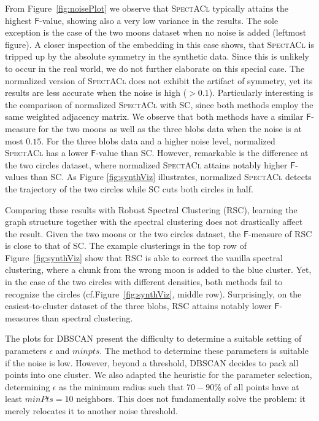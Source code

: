 From Figure~\ref{fig:noisePlot} we observe that \textsc{SpectACl} typically attains the highest $\mathsf{F}$-value, showing also a very low variance in the results. The sole exception is the case of the two moons dataset when no noise is added (leftmost figure). A closer inspection of the embedding in this case shows, that \textsc{SpectACl} is tripped up by the absolute symmetry in the synthetic data. Since this is unlikely to occur in the real world, we do not further elaborate on this special case. 
The normalized version of \textsc{SpectACl} does not exhibit the artifact of symmetry, yet its results are less accurate when the noise is high ($>0.1$). Particularly interesting is the comparison of normalized \textsc{SpectACl} with \textsc{SC}, since both methods employ the same weighted adjacency matrix. We observe that both methods have a similar $\mathsf{F}$-measure for the two moons as well as the three blobs data when the noise is at most $0.15$. For the three blobs data and a higher noise level, normalized \textsc{SpectACl} has a lower $\mathsf{F}$-value than \textsc{SC}. However, remarkable is the difference at the two circles dataset, where  normalized \textsc{SpectACl} attains notably higher $\mathsf{F}$-values than \textsc{SC}. As Figure \ref{fig:synthViz} illustrates, normalized \textsc{SpectACl} detects the trajectory of the two circles while \textsc{SC} cuts both circles in half. 

Comparing these results with Robust Spectral Clustering (\textsc{RSC}), learning the graph structure together with the spectral clustering does not drastically affect the result. Given the two moons or the two circles dataset, the $\mathsf{F}$-measure of \textsc{RSC} is close to that of \textsc{SC}. The example clusterings in the top row of Figure~\ref{fig:synthViz} show that \textsc{RSC} is able to correct the vanilla spectral clustering, where a chunk from the wrong moon is added to the blue cluster. Yet, in the case of the two circles with different densities, both methods fail to recognize the circles (cf.\@ Figure~\ref{fig:synthViz}, middle row). Surprisingly, on the easiest-to-cluster dataset of the three blobs, \textsc{RSC} attains notably lower $\mathsf{F}$-measures than spectral clustering.

The plots for DBSCAN present the difficulty to determine a suitable setting of parameters $\epsilon$ and $minpts$. The method to determine these parameters is suitable if the noise is low. However, beyond a threshold, DBSCAN decides to pack all points into one cluster. We also adapted the heuristic for the parameter selection, determining $\epsilon$ as the minimum radius such that $70-90\%$ of all points have at least $minPts=10$ neighbors. This does not fundamentally solve the problem: it merely relocates it to another noise threshold.
